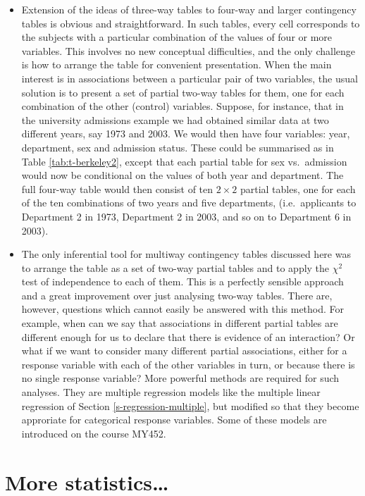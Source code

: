 \documentclass[11pt,a4paper,openany]{book}
\begin{document}
\begin{itemize}
\item
  Extension of the ideas of three-way tables to four-way and larger
  contingency tables is obvious and straightforward. In such tables,
  every cell corresponds to the subjects with a particular combination
  of the values of four or more variables. This involves no new
  conceptual difficulties, and the only challenge is how to arrange the
  table for convenient presentation. When the main interest is in
  associations between a particular pair of two variables, the usual
  solution is to present a set of partial two-way tables for them, one
  for each combination of the other (control) variables. Suppose, for
  instance, that in the university admissions example we had obtained
  similar data at two different years, say 1973 and 2003. We would then
  have four variables: year, department, sex and admission status. These
  could be summarised as in Table \ref{tab:t-berkeley2}, except that
  each partial table for sex vs.~admission would now be conditional on
  the values of both year and department. The full four-way table would
  then consist of ten \(2\times 2\) partial tables, one for each of the
  ten combinations of two years and five departments, (i.e.~applicants
  to Department 2 in 1973, Department 2 in 2003, and so on to Department
  6 in 2003).
\item
  The only inferential tool for multiway contingency tables discussed
  here was to arrange the table as a set of two-way partial tables and
  to apply the \(\chi^{2}\) test of independence to each of them. This
  is a perfectly sensible approach and a great improvement over just
  analysing two-way tables. There are, however, questions which cannot
  easily be answered with this method. For example, when can we say that
  associations in different partial tables are different enough for us
  to declare that there is evidence of an interaction? Or what if we
  want to consider many different partial associations, either for a
  response variable with each of the other variables in turn, or because
  there is no single response variable? More powerful methods are
  required for such analyses. They are multiple regression models like
  the multiple linear regression of Section \ref{s-regression-multiple},
  but modified so that they become approriate for categorical response
  variables. Some of these models are introduced on the course MY452.
\end{itemize}

\chapter{More statistics\ldots{}}\label{c-more}
\end{document}
